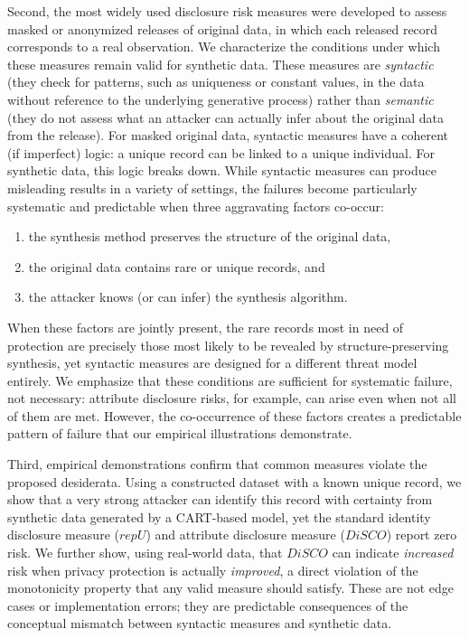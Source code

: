 \documentclass[Afour,sageh,times,doublespace]{sagej}
\begin{document}
Second, the most widely used disclosure risk measures were developed to assess masked or anonymized releases of original data, in which each released record corresponds to a real observation. We characterize the conditions under which these measures remain valid for synthetic data. These measures are \textit{syntactic} (they check for patterns, such as uniqueness or constant values, in the data without reference to the underlying generative process) rather than \textit{semantic} (they do not assess what an attacker can actually infer about the original data from the release). For masked original data, syntactic measures have a coherent (if imperfect) logic: a unique record can be linked to a unique individual. For synthetic data, this logic breaks down. While syntactic measures can produce misleading results in a variety of settings, the failures become particularly systematic and predictable when three aggravating factors co-occur:
\begin{enumerate}
\item the synthesis method preserves the structure of the original data,
\item the original data contains rare or unique records, and
\item the attacker knows (or can infer) the synthesis algorithm.
\end{enumerate}
When these factors are jointly present, the rare records most in need of protection are precisely those most likely to be revealed by structure-preserving synthesis, yet syntactic measures are designed for a different threat model entirely. We emphasize that these conditions are sufficient for systematic failure, not necessary: attribute disclosure risks, for example, can arise even when not all of them are met. However, the co-occurrence of these factors creates a predictable pattern of failure that our empirical illustrations demonstrate.

Third, empirical demonstrations confirm that common measures violate the proposed desiderata. Using a constructed dataset with a known unique record, we show that a very strong attacker can identify this record with certainty from synthetic data generated by a CART-based model, yet the standard identity disclosure measure ($repU$) and attribute disclosure measure ($DiSCO$) report zero risk. We further show, using real-world data, that $DiSCO$ can indicate \textit{increased} risk when privacy protection is actually \textit{improved}, a direct violation of the monotonicity property that any valid measure should satisfy. These are not edge cases or implementation errors; they are predictable consequences of the conceptual mismatch between syntactic measures and synthetic data.
\end{document}
